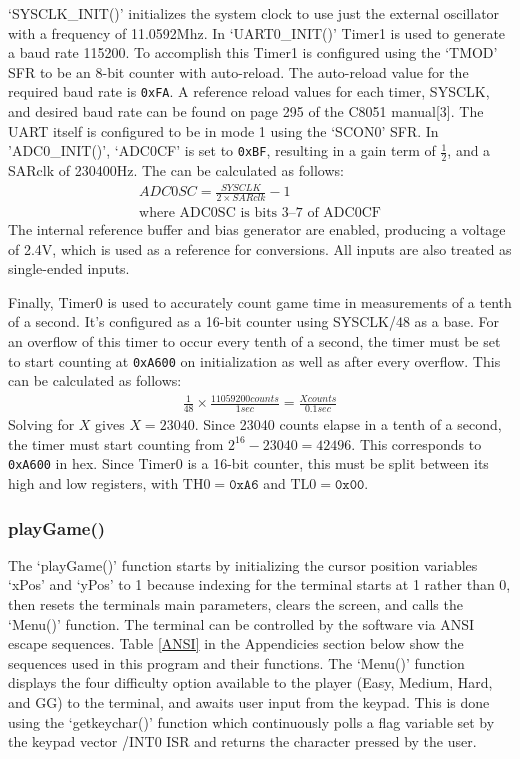 \documentclass[12pt]{article}
\begin{document}
`SYSCLK\_INIT()' initializes the system clock to use just the external oscillator with a frequency of 11.0592\si{Mhz}. In `UART0\_INIT()' Timer1 is used to generate a baud rate 115200. To accomplish this Timer1 is configured using the `TMOD' SFR to be an 8-bit counter with auto-reload. The auto-reload value for the required baud rate is \texttt{0xFA}. A reference reload values for each timer, SYSCLK, and desired baud rate can be found on page 295 of the C8051 manual[3]. The UART itself is configured to be in mode 1 using the `SCON0' SFR. In 'ADC0\_INIT()', `ADC0CF' is set to \texttt{0xBF}, resulting in a gain term of $\frac{1}{2}$, and a SARclk of 230400\si{Hz}. The can be calculated as follows: 
\begin{gather*}
ADC0SC=\frac{SYSCLK}{2\times SARclk}-1\\
\textrm{where ADC0SC is bits 3--7 of ADC0CF}
\end{gather*}
The internal reference buffer and bias generator are enabled, producing a voltage of 2.4\si{V}, which is used as a reference for conversions. All inputs are also treated as single-ended inputs.

Finally, Timer0 is used to accurately count game time in measurements of a tenth of a second. It's configured as a 16-bit counter using SYSCLK/48 as a base. For an overflow of this timer to occur every tenth of a second, the timer must be set to start counting at \texttt{0xA600} on initialization as well as after every overflow. This can be calculated as follows:
\begin{gather*}
\frac{1}{48}\times \frac{11059200 \si{counts}}{\si{1}{sec}}=\frac{X\si{counts}}{0.1\si{sec}}
\end{gather*}
Solving for $X$ gives $X=23040$. Since 23040 counts elapse in a tenth of a second, the timer must start counting from $2^{16}-23040=42496$. This corresponds to \texttt{0xA600} in hex. Since Timer0 is a 16-bit counter, this must be split between its high and low registers, with $\mathrm{TH0}=\texttt{0xA6}$ and $\mathrm{TL0}=\texttt{0x00}$.

\subsubsection{playGame()}
The `playGame()' function starts by initializing the cursor position variables `xPos' and `yPos' to 1 because indexing for the terminal starts at 1 rather than 0, then resets the terminals main parameters, clears the screen, and calls the `Menu()' function. The terminal can be controlled by the software via ANSI escape sequences. Table \ref{ANSI} in the Appendicies section below show the sequences used in this program and their functions. The `Menu()' function displays the four difficulty option available to the player (Easy, Medium, Hard, and GG) to the terminal, and awaits user input from the keypad. This is done using the `getkeychar()' function which continuously polls a flag variable set by the keypad vector /INT0 ISR and returns the character pressed by the user.
\end{document}
